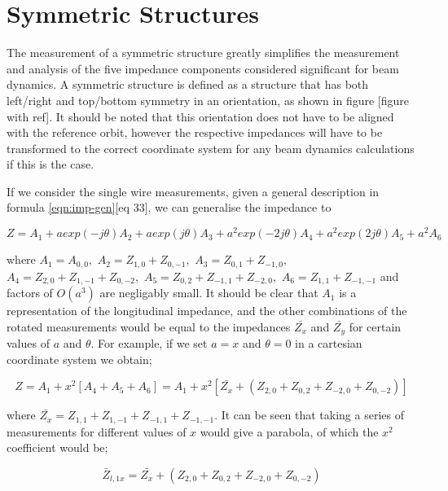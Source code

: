\section{Symmetric Structures}

The measurement of a symmetric structure greatly simplifies the measurement and analysis of the five impedance components considered significant for beam dynamics. A symmetric structure is defined as a structure that has both left/right and top/bottom symmetry in an orientation, as shown in figure [figure with ref]. It should be noted that this orientation does not have to be aligned with the reference orbit, however the respective impedances will have to be transformed to the correct coordinate system for any beam dynamics calculations if this is the case.

If we consider the single wire measurements, given a general description in formula \eqref{eqn:imp-gen}[eq 33], we can generalise the impedance to

\begin{equation}
Z = A_{1} + aexp(-j\theta) A_{2} + aexp(j\theta) A_{3} + a^{2}exp(-2j\theta) A_{4} + a^{2}exp(2j\theta) A_{5} + a^{2} A_{6}
\end{equation}

where $A_{1} = A_{0,0},$ $A_{2} = Z_{1,0} + Z_{0,-1}, $ $A_{3} = Z_{0,1} + Z_{-1,0}, $ $A_{4} = Z_{2,0} + Z_{1,-1} + Z_{0,-2}, $ $A_{5} = Z_{0,2} + Z_{-1,1} + Z_{-2,0}, $ $A_{6} = Z_{1,1} + Z_{-1,-1}$ and factors of $O(a^{3})$ are negligably small. It should be clear that $A_{1}$ is a representation of the longitudinal impedance, and the other combinations of the rotated measurements would be equal to the impedances $\bar{Z_{x}}$ and $\bar{Z_{y}}$ for certain values of $a$ and $\theta$. For example, if we set $a=x$ and $\theta  = 0$ in a cartesian coordinate system we obtain;

\begin{equation}
Z = A_{1} + x^{2}\left[A_{4} + A_{5} +A_{6}\right] = A_{1} + x^{2}\left[ \bar{Z_{x}} + \left(Z_{2,0} + Z_{0,2} + Z_{-2,0} + Z_{0,-2}\right) \right]
\end{equation}

where $\bar{Z_{x}} = Z_{1,1} + Z_{1,-1} + Z_{-1,1} + Z_{-1,-1}$. It can be seen that taking a series of measurements for different values of $x$ would give a parabola, of which the $x^{2}$ coefficient would be;

\begin{equation}
\bar{Z}_{l,1x} = \bar{Z_{x}} + \left(Z_{2,0} + Z_{0,2} + Z_{-2,0} + Z_{0,-2}\right)
\end{equation}

